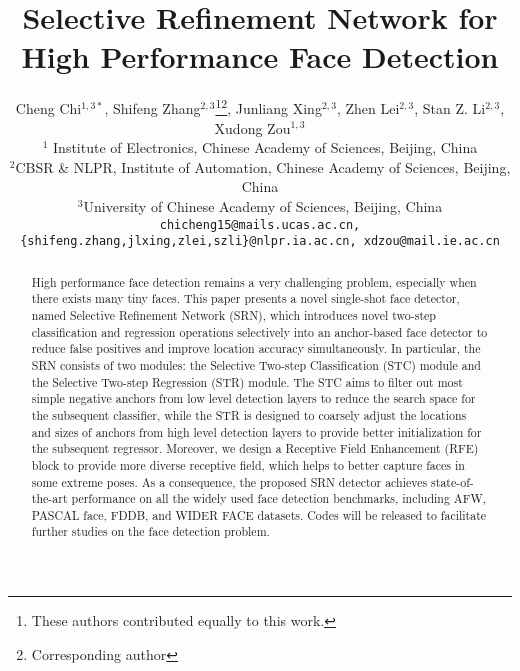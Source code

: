 \documentclass[letterpaper]{article} \usepackage{aaai19m}  \usepackage{times}  \usepackage{helvet}  \usepackage{courier}  \usepackage{url}  \usepackage{graphicx}  \usepackage{subfigure}
\begin{document}
\title{Selective Refinement Network for High Performance Face Detection}
\author{
Cheng Chi$^{1,3*}$, Shifeng Zhang$^{2,3}$\thanks{These authors contributed equally to this work.}\thanks{Corresponding author}, Junliang Xing$^{2,3}$, Zhen Lei$^{2,3}$, Stan Z. Li$^{2,3}$, Xudong Zou$^{1,3}$\\
$^{1}$ Institute of Electronics, Chinese Academy of Sciences, Beijing, China\\
$^{2}$CBSR \& NLPR, Institute of Automation, Chinese Academy of Sciences, Beijing, China\\
$^{3}$University of Chinese Academy of Sciences, Beijing, China\\
{\tt\small chicheng15@mails.ucas.ac.cn, \{shifeng.zhang,jlxing,zlei,szli\}@nlpr.ia.ac.cn, xdzou@mail.ie.ac.cn}\\
}
\maketitle

\begin{abstract}
High performance face detection remains a very challenging problem, especially when there exists many tiny faces. This paper presents a novel single-shot face detector, named Selective Refinement Network (SRN), which introduces novel two-step classification and regression operations selectively into an anchor-based face detector to reduce false positives and improve location accuracy simultaneously. In particular, the SRN consists of two modules: the Selective Two-step Classification (STC) module and the Selective Two-step Regression (STR) module. The STC aims to filter out most simple negative anchors from low level detection layers to reduce the search space for the subsequent classifier, while the STR is designed to coarsely adjust the locations and sizes of anchors from high level detection layers to provide better initialization for the subsequent regressor. Moreover, we design a Receptive Field Enhancement (RFE) block to provide more diverse receptive field, which helps to better capture faces in some extreme poses. As a consequence, the proposed SRN detector achieves state-of-the-art performance on all the widely used face detection benchmarks, including AFW, PASCAL face, FDDB, and WIDER FACE datasets. Codes will be released to facilitate further studies on the face detection problem.
\end{abstract}
\end{document}
